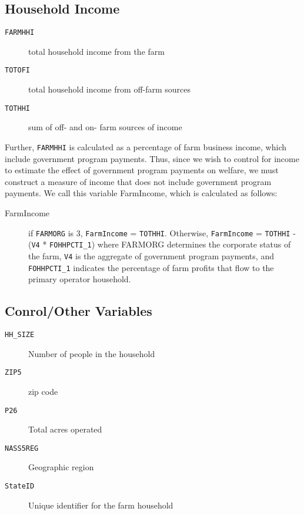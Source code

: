 \documentclass[11pt]{article}
\begin{document}
\subsection{Household Income}
\label{sec:org4cd94bd}
\begin{description}
\item[{\texttt{FARMHHI}}] total household income from the farm
\item[{\texttt{TOTOFI}}] total household income from off-farm sources
\item[{\texttt{TOTHHI}}] sum of off- and on- farm sources of income
\end{description}

Further, \texttt{FARMHHI} is calculated as a percentage of farm business income, which include government program payments. Thus, since we wish to control for income to estimate the effect of government program payments on welfare, we must construct a measure of income that does not include government program payments. We call this variable FarmIncome, which is calculated as follows: 

\begin{description}
\item[{FarmIncome}] if \texttt{FARMORG} is 3, \texttt{FarmIncome} = \texttt{TOTHHI}. Otherwise, \texttt{FarmIncome} = \texttt{TOTHHI} - (\texttt{V4} * \texttt{FOHHPCTI\_1}) where FARMORG determines the corporate status of the farm, \texttt{V4} is the aggregate of government program payments, and \texttt{FOHHPCTI\_1} indicates the percentage of farm profits that flow to the primary operator household.
\end{description}
\subsection{Conrol/Other Variables}
\label{sec:org95292e7}
\begin{description}
\item[{\texttt{HH\_SIZE}}] Number of people in the household
\item[{\texttt{ZIP5}}] zip code
\item[{\texttt{P26}}] Total acres operated
\item[{\texttt{NASS5REG}}] Geographic region
\item[{\texttt{StateID}}] Unique identifier for the farm household
\end{description}
\end{document}
